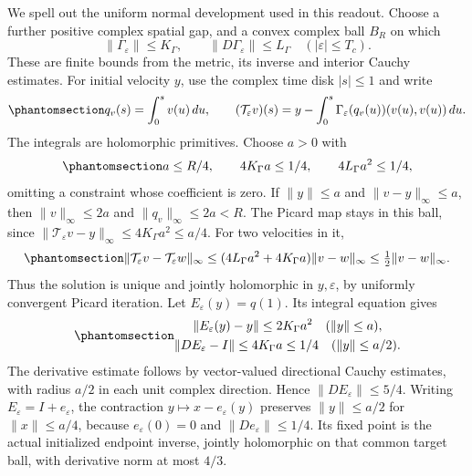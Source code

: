\documentclass[
  english,
  11pt,
  reqno]{amsart}
\begin{document}
We spell out the uniform normal development used in this readout. Choose
a further positive complex spatial gap, and a convex complex ball
\(B_R\) on which \[
 \|\Gamma_\varepsilon\|\le K_\Gamma,\qquad
 \|D\Gamma_\varepsilon\|\le L_\Gamma
 \quad(|\varepsilon|\le T_c).
\] These are finite bounds from the metric, its inverse and interior
Cauchy estimates. For initial velocity \(y\), use the complex time disk
\(|s|\le1\) and write
\begin{equation}\protect\phantomsection\label{eq:sh-r1-normal-picard-map}{
 q_v(s)=\int_0^s v(u)\,du,\qquad
 (\mathcal T_\varepsilon v)(s)
 =y-\int_0^s\Gamma_\varepsilon(q_v(u))(v(u),v(u))\,du.
}\end{equation} The integrals are holomorphic primitives. Choose \(a>0\)
with
\begin{equation}\protect\phantomsection\label{eq:sh-r1-picard-margins}{
 a\le R/4,\qquad
 4K_\Gamma a\le1/4,\qquad
 4L_\Gamma a^2\le1/4,
}\end{equation} omitting a constraint whose coefficient is zero. If
\(\|y\|\le a\) and \(\|v-y\|_\infty\le a\), then \(\|v\|_\infty\le2a\)
and \(\|q_v\|_\infty\le2a<R\). The Picard map stays in this ball, since
\(\|\mathcal T_\varepsilon v-y\|_\infty\le4K_\Gamma a^2\le a/4\). For
two velocities in it,
\begin{equation}\protect\phantomsection\label{eq:sh-r1-picard-contraction}{
 \|\mathcal T_\varepsilon v-\mathcal T_\varepsilon w\|_\infty
 \le(4L_\Gamma a^2+4K_\Gamma a)\|v-w\|_\infty
 \le\tfrac12\|v-w\|_\infty.
}\end{equation} Thus the solution is unique and jointly holomorphic in
\(y,\varepsilon\), by uniformly convergent Picard iteration. Let
\(E_\varepsilon(y)=q(1)\). Its integral equation gives
\begin{equation}\protect\phantomsection\label{eq:sh-r1-normal-endpoint-margin}{\begin{gathered}
\|E_\varepsilon(y)-y\|\le2K_\Gamma a^2\quad(\|y\|\le a), \\
\|DE_\varepsilon-I\|\le4K_\Gamma a\le1/4
 \quad(\|y\|\le a/2).
\end{gathered}}\end{equation} The derivative estimate follows by vector-valued
directional Cauchy estimates, with radius \(a/2\) in each unit complex
direction. Hence \(\|DE_\varepsilon\|\le5/4\). Writing
\(E_\varepsilon=I+e_\varepsilon\), the contraction
\(y\mapsto x-e_\varepsilon(y)\) preserves \(\|y\|\le a/2\) for
\(\|x\|\le a/4\), because \(e_\varepsilon(0)=0\) and
\(\|De_\varepsilon\|\le1/4\). Its fixed point is the actual initialized
endpoint inverse, jointly holomorphic on that common target ball, with
derivative norm at most \(4/3\).
\end{document}
